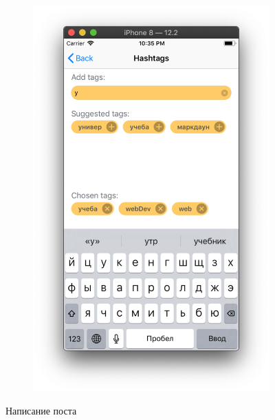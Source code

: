 \documentclass[a4paper,12pt]{article}
\begin{document}
\begin{figure}[h!]
\begin{subfigure}[b]{0.3\linewidth}
		\end{subfigure}
		\begin{subfigure}[b]{0.3\linewidth}
			\includegraphics[width=\linewidth]{../includes/pmi/choose_hashtag.png}
		\end{subfigure}
		\caption{\label{pic: hash}Написание поста}
	\end{figure}
	\clearpage
\end{document}
